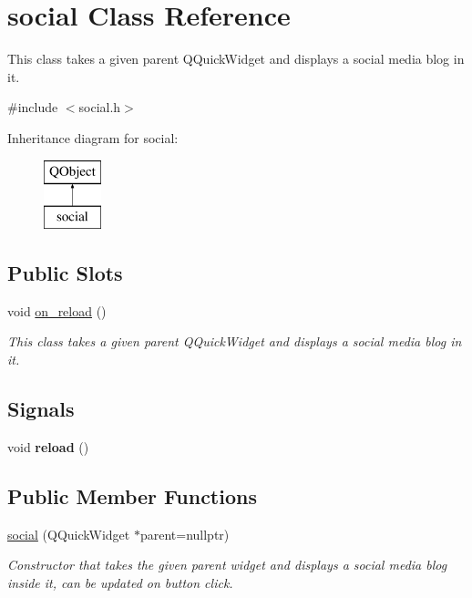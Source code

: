 \hypertarget{classsocial}{}\section{social Class Reference}
\label{classsocial}


This class takes a given parent Q\+Quick\+Widget and displays a social media blog in it.  




{\ttfamily \#include $<$social.\+h$>$}

Inheritance diagram for social\+:\begin{figure}[H]
\begin{center}
\leavevmode
\includegraphics[height=2.000000cm]{classsocial}
\end{center}
\end{figure}
\subsection*{Public Slots}
\begin{DoxyCompactItemize}
\item 
void \mbox{\hyperlink{classsocial_aed7a46c6bae233cd68a61aefc8ba3915}{on\+\_\+reload}} ()
\begin{DoxyCompactList}\small\item\em This class takes a given parent Q\+Quick\+Widget and displays a social media blog in it. \end{DoxyCompactList}\end{DoxyCompactItemize}
\subsection*{Signals}
\begin{DoxyCompactItemize}
\item 
\mbox{\label{classsocial_a000ed24b8b1e7abfc04dce3b76139fcd}} 
void {\bfseries reload} ()
\end{DoxyCompactItemize}
\subsection*{Public Member Functions}
\begin{DoxyCompactItemize}
\item 
\mbox{\hyperlink{classsocial_ae8c36ee55976d5b9fb5f7738be4ed2c1}{social}} (Q\+Quick\+Widget $\ast$parent=nullptr)
\begin{DoxyCompactList}\small\item\em Constructor that takes the given parent widget and displays a social media blog inside it, can be updated on button click. \end{DoxyCompactList}\end{DoxyCompactItemize}
